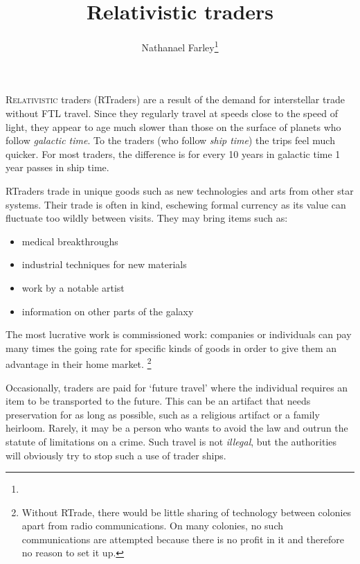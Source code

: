 \documentclass[a4paper,twocolumn]{memoir}
\begin{document}
\title{Relativistic traders}
\author{Nathanael Farley\thanks{}}
\maketitle


\lettrine{R}{elativistic} traders (RTraders) are a result of the demand for
interstellar trade without FTL travel. Since they regularly travel at speeds
close to the speed of light, they appear to age much slower than those on the
surface of planets who follow \emph{galactic time}. To the traders (who follow
\emph{ship time}) the trips feel much quicker. For most traders, the difference
is for every 10 years in galactic time 1 year passes in ship time. 

RTraders trade in unique goods such as new technologies and arts from other star
systems. Their trade is often in kind, eschewing formal currency as its value
can fluctuate too wildly between visits. They may bring items such as:
\begin{itemize}
\item medical breakthroughs
\item industrial techniques for new materials
\item work by a notable artist
\item information on other parts of the galaxy
\end{itemize}
The most lucrative work is commissioned work: companies or individuals can pay
many times the going rate for specific kinds of goods in order to give them an
advantage in their home market. \footnote{Without RTrade, there would be little
  sharing of technology between colonies apart from radio communications. On
  many colonies, no such communications are attempted because there is no profit
  in it and therefore no reason to set it up.}

Occasionally, traders are paid for `future travel' where the individual requires
an item to be transported to the future. This can be an artifact that needs
preservation for as long as possible, such as a religious artifact or a family
heirloom. Rarely, it may be a person who wants to avoid the law and outrun the
statute of limitations on a crime. Such travel is not \emph{illegal}, but the
authorities will obviously try to stop such a use of trader ships.
\end{document}
